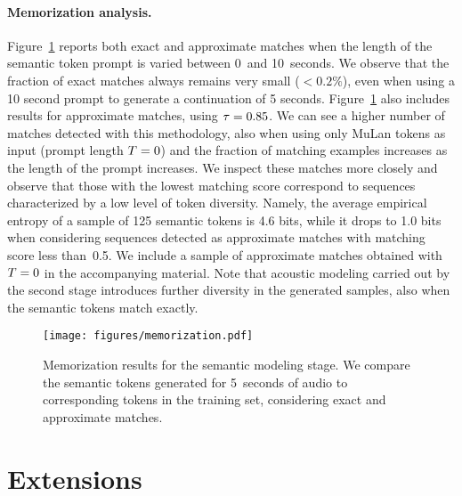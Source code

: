 \paragraph{Memorization analysis.}
\label{results/memorization}
Figure~\ref{fig:memorization} reports both exact and approximate matches when the length of the semantic token prompt is varied between 0~and 10~seconds. We observe that the fraction of exact matches always remains very small ($< 0.2\%$), even when using a 10 second prompt to generate a continuation of 5 seconds. Figure~\ref{fig:memorization} also includes results for approximate matches, using $\tau = 0.85$. We can see a higher number of matches detected with this methodology, also when using only MuLan tokens as input (prompt length $T=0$) and the fraction of matching examples increases as the length of the prompt increases. We inspect these matches more closely and observe that those with the lowest matching score correspond to sequences characterized by a low level of token diversity. Namely, the average empirical entropy of a sample of 125 semantic tokens is 4.6 bits, while it drops to 1.0 bits when considering sequences detected as approximate matches with matching score less than~0.5. We include a sample of approximate matches obtained with $T=0$ in the accompanying material. Note that acoustic modeling carried out by the second stage introduces further diversity in the generated samples, also when the semantic tokens match exactly. 

\begin{figure}[t]
\begin{center}
    \centerline{\texttt{[image: figures/memorization.pdf]}}
    \vspace{-2mm}
    \caption{Memorization results for the semantic modeling stage. We compare the semantic tokens generated for 5~seconds of audio to corresponding tokens in the training set, considering exact and approximate matches.}
    \label{fig:memorization}
    \vspace{-6mm}
\end{center}
\end{figure}

\section{Extensions}
